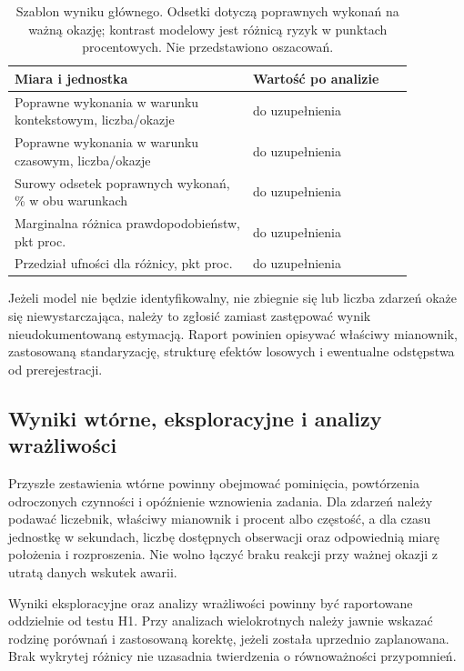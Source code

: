 \documentclass[11pt,a4paper]{article}
\begin{document}
\begin{table}[htbp]
\centering
\caption{Szablon wyniku głównego. Odsetki dotyczą poprawnych wykonań na ważną okazję; kontrast modelowy jest różnicą ryzyk w punktach procentowych. Nie przedstawiono oszacowań.}
\label{tab:primary-template}
\small
\begin{tabular}{p{0.52\linewidth}p{0.35\linewidth}}
\hline
Miara i jednostka & Wartość po analizie \\
\hline
Poprawne wykonania w warunku kontekstowym, liczba/okazje & do uzupełnienia \\
Poprawne wykonania w warunku czasowym, liczba/okazje & do uzupełnienia \\
Surowy odsetek poprawnych wykonań, \% w obu warunkach & do uzupełnienia \\
Marginalna różnica prawdopodobieństw, pkt proc. & do uzupełnienia \\
Przedział ufności dla różnicy, pkt proc. & do uzupełnienia \\
\hline
\end{tabular}
\end{table}

Jeżeli model nie będzie identyfikowalny, nie zbiegnie się lub liczba zdarzeń okaże się niewystarczająca, należy to zgłosić zamiast zastępować wynik nieudokumentowaną estymacją. Raport powinien opisywać właściwy mianownik, zastosowaną standaryzację, strukturę efektów losowych i ewentualne odstępstwa od prerejestracji.

\subsection{Wyniki wtórne, eksploracyjne i analizy wrażliwości}
Przyszłe zestawienia wtórne powinny obejmować pominięcia, powtórzenia odroczonych czynności i opóźnienie wznowienia zadania. Dla zdarzeń należy podawać liczebnik, właściwy mianownik i procent albo częstość, a dla czasu jednostkę w sekundach, liczbę dostępnych obserwacji oraz odpowiednią miarę położenia i rozproszenia. Nie wolno łączyć braku reakcji przy ważnej okazji z utratą danych wskutek awarii.

Wyniki eksploracyjne oraz analizy wrażliwości powinny być raportowane oddzielnie od testu H1. Przy analizach wielokrotnych należy jawnie wskazać rodzinę porównań i zastosowaną korektę, jeżeli została uprzednio zaplanowana. Brak wykrytej różnicy nie uzasadnia twierdzenia o równoważności przypomnień.
\end{document}
